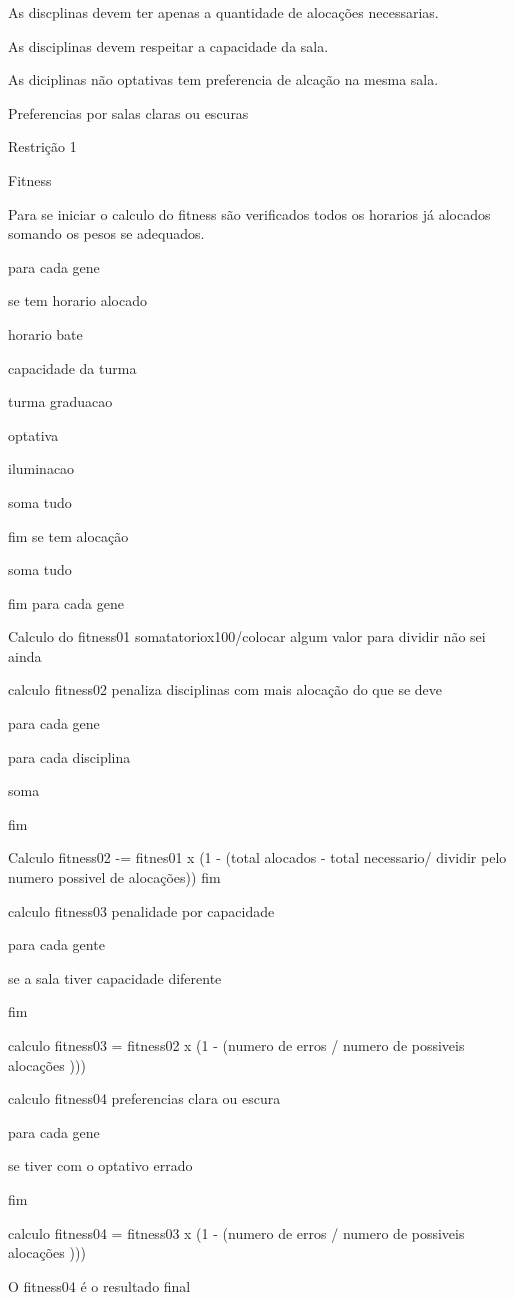 \documentclass{abntpuc}
\begin{document}
As discplinas devem ter apenas a quantidade de alocações necessarias.

As disciplinas devem respeitar a capacidade da sala.

As diciplinas não optativas tem preferencia de alcação na mesma sala.

Preferencias por salas claras ou escuras

Restrição 1 


Fitness

Para se iniciar o calculo do fitness são verificados todos os horarios já alocados somando os pesos se adequados.

para cada gene

se tem horario alocado 

horario bate

capacidade da turma

turma graduacao

optativa

iluminacao

soma tudo

fim se tem alocação

soma tudo

fim para cada gene

Calculo do fitness01 somatatoriox100/colocar algum valor  para dividir não sei ainda

calculo fitness02 penaliza disciplinas com mais alocação do que se deve

para cada gene 

para cada disciplina 

soma

fim

Calculo fitness02 -= fitnes01 x (1 - (total alocados - total necessario/ dividir pelo numero possivel de alocações))
fim

calculo fitness03 penalidade por capacidade

para cada gente

se a sala tiver capacidade diferente

fim

calculo fitness03 = fitness02 x (1 - (numero de erros /  numero de possiveis alocações )))


calculo fitness04 preferencias clara ou escura

para cada gene 

se tiver com o optativo errado 

fim	

calculo fitness04 = fitness03 x (1 - (numero de erros /  numero de possiveis alocações )))


O fitness04 é o resultado final





%

%
\end{document}
